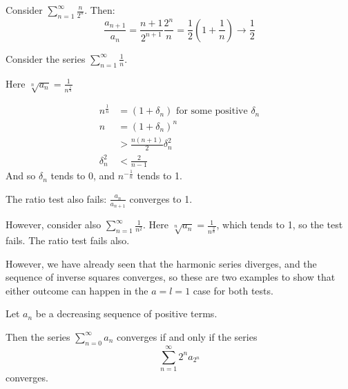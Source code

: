 \documentclass[../Main.tex]{subfiles}
\begin{document}
\begin{example}
    Consider $\sum_{n=1}^{\infty} \frac{n}{2^n}$. Then:
    \begin{equation*}
        \frac{a_{n+1}}{a_n} = \frac{n+1}{2^{n+1}} \frac{2^n}{n} = \frac{1}{2} \left(1 + \frac{1}{n}\right) \to \frac{1}{2}
    \end{equation*}
\end{example}
\begin{example}
    Consider the series $\sum_{n=1}^\infty \frac{1}{n}$.\par
    Here $\sqrt[n]{a_n} = \frac{1}{n^{\frac{1}{n}}}$\par
    \begin{align*}
        n^{\frac{1}{n}} &= (1 + \delta_n) \text{ for some positive } \delta_n \\
        n &= (1 + \delta_n)^n \\
        &>\frac{n(n+1)}{2} \delta_n^2 \\
        \delta_n^2 &< \frac{2}{n-1}
    \end{align*}
    And so $\delta_n$ tends to $0$, and $n^{-\frac{1}{n}}$ tends to 1.\par
    The ratio test also fails: $\frac{a_n}{a_{n+1}}$ converges to 1.\par
    However, consider also $\sum_{n=1}^\infty \frac{1}{n^2}$. Here $\sqrt[n]{a_n} = \frac{1}{n^{\frac{2}{n}}}$, which tends to 1, so the test fails. The ratio test fails also.\par
    However, we have already seen that the harmonic series diverges, and the sequence of inverse squares converges, so these are two examples to show that either outcome can happen in the $a = l = 1$ case for both tests.
    \label{exRootAndRatioFail}
\end{example}
\begin{theorem}
    Let $a_n$ be a decreasing sequence of positive terms.\par
    Then the series $\sum_{n=0}^\infty a_n$ converges if and only if the series
    \begin{equation*}
        \sum_{n=1}^\infty 2^n a_{2^n}
    \end{equation*}
    converges.
    \label{thmCauchyCondensation}
\end{theorem}
\end{document}

